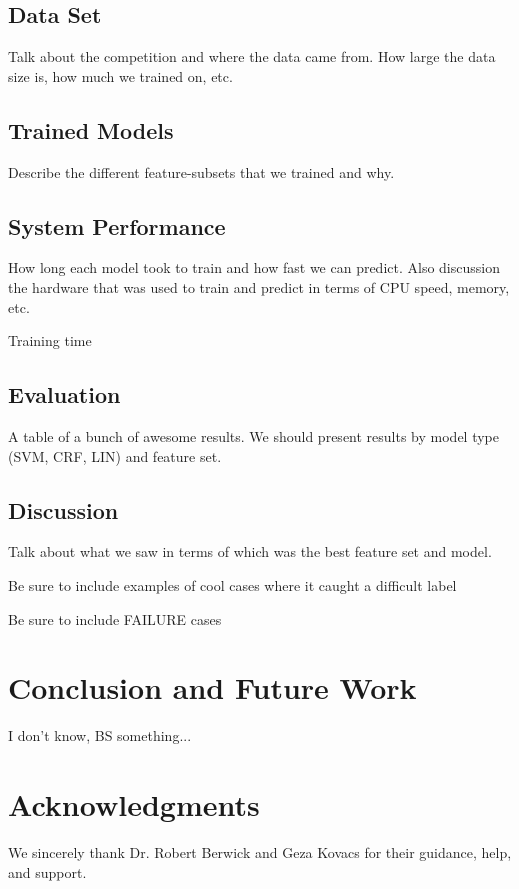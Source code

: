 \documentclass[preprint]{style}
\begin{document}
\subsection{Data Set}

Talk about the competition and where the data came from. How large the data size is, how much we trained on, etc.

\subsection{Trained Models}

Describe the different feature-subsets that we trained and why.


\subsection{System Performance}

How long each model took to train and how fast we can predict. Also discussion the hardware that was used to train and predict in terms of CPU speed, memory, etc.

Training time

\subsection{Evaluation}

A table of a bunch of awesome results. We should present results by model type (SVM, CRF, LIN) and feature set.

\subsection{Discussion}

Talk about what we saw in terms of which was the best feature set and model. 

Be sure to include examples of cool cases where it caught a difficult label

Be sure to include FAILURE cases

\section{Conclusion and Future Work}

I don't know, BS something...


\section{Acknowledgments}

We sincerely thank Dr. Robert Berwick  and Geza Kovacs
for their guidance, help, and support.



%


\balancecolumns
\end{document}

